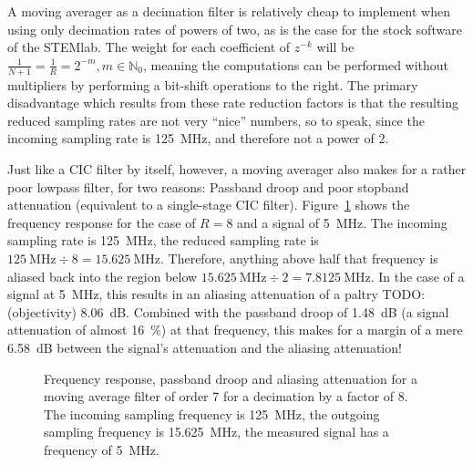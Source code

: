 A moving averager as a decimation filter is relatively cheap to implement when
using only  decimation rates of powers  of two, as  is the case for  the stock
software of the  STEMlab. The weight for each coefficient of  $z^{-k}$ will be
$\frac{1}{N+1}  =  \frac{1}{R} =  2^{-m},  m  \in \mathbb{N}_0$,  meaning  the
computations can  be performed without  multipliers by performing  a bit-shift
operations to  the right. The  primary disadvantage  which results  from these
rate reduction  factors is that the  resulting reduced sampling rates  are not
very  ``nice'' numbers,  so  to speak,  since the  incoming  sampling rate  is
\SI{125}{\MHz}, and therefore not a power of \num{2}.

Just  like a  CIC filter  by  itself, however,  a moving  averager also  makes
for  a  rather  poor  lowpass  filter, for  two  reasons: Passband  droop  and
poor  stopband   attenuation  (equivalent  to  a   single-stage  CIC  filter).
Figure~\ref{fig:stl125:moving_averager} shows  the frequency response  for the
case of  $R=8$ and  a signal  of \SI{5}{\MHz}. The  incoming sampling  rate is
\SI{125}{\MHz},  the  reduced  sampling  rate  is  $\SI{125}{\MHz}  \div  8  =
\SI{15.625}{\MHz}$. Therefore, anything  above half that frequency  is aliased
back into the region below $\SI{15.625}{\MHz} \div 2 = \SI{7.8125}{\MHz}$.  In
the case of a signal at  \SI{5}{\MHz}, this results in an aliasing attenuation
of a paltry TODO: (objectivity) \SI{8.06}{\dB}. Combined with the passband droop of \SI{1.48}{\dB}
(a signal  attenuation of  almost \SI{16}{\percent})  at that  frequency, this
makes for a  margin of a mere \SI{6.58}{\dB} between  the signal's attenuation
and the aliasing attenuation!

\begin{figure}
    \centering
    
    \caption{%
        Frequency  response, passband  droop  and aliasing  attenuation for  a
        moving  average  filter  of  order  \num{7}  for  a  decimation  by  a
        factor of \num{8}. The incoming  sampling frequency is \SI{125}{\MHz},
        the  outgoing sampling  frequency is  \SI{15.625}{\MHz}, the  measured
        signal  has   a  frequency   of  \SI{5}{MHz}.%
    }
    \label{fig:stl125:moving_averager}
\end{figure}

